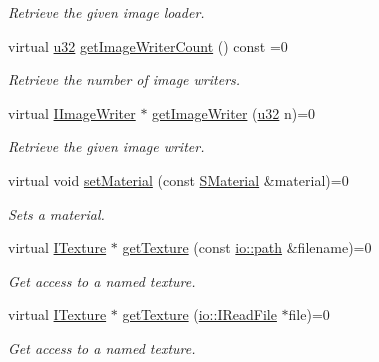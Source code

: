 \begin{DoxyCompactItemize}
\begin{DoxyCompactList}\small\item\em Retrieve the given image loader. \end{DoxyCompactList}\item 
virtual \hyperlink{namespaceirr_a0416a53257075833e7002efd0a18e804}{u32} \hyperlink{classirr_1_1video_1_1IVideoDriver_a173f33f0537a1511abdf35ed235a683a}{get\+Image\+Writer\+Count} () const =0
\begin{DoxyCompactList}\small\item\em Retrieve the number of image writers. \end{DoxyCompactList}\item 
virtual \hyperlink{classirr_1_1video_1_1IImageWriter}{I\+Image\+Writer} $\ast$ \hyperlink{classirr_1_1video_1_1IVideoDriver_acdc5e788993c117efebb22e155ab6a77}{get\+Image\+Writer} (\hyperlink{namespaceirr_a0416a53257075833e7002efd0a18e804}{u32} n)=0
\begin{DoxyCompactList}\small\item\em Retrieve the given image writer. \end{DoxyCompactList}\item 
virtual void \hyperlink{classirr_1_1video_1_1IVideoDriver_a8c9e31b41b7e6fd26cf65ce538ebab05}{set\+Material} (const \hyperlink{classirr_1_1video_1_1SMaterial}{S\+Material} \&material)=0
\begin{DoxyCompactList}\small\item\em Sets a material. \end{DoxyCompactList}\item 
virtual \hyperlink{classirr_1_1video_1_1ITexture}{I\+Texture} $\ast$ \hyperlink{classirr_1_1video_1_1IVideoDriver_af4055165190e4adf221c6dc6f2434ea0}{get\+Texture} (const \hyperlink{namespaceirr_1_1io_a6468281622ce3a1c46b72e19f32dded5}{io\+::path} \&filename)=0
\begin{DoxyCompactList}\small\item\em Get access to a named texture. \end{DoxyCompactList}\item 
virtual \hyperlink{classirr_1_1video_1_1ITexture}{I\+Texture} $\ast$ \hyperlink{classirr_1_1video_1_1IVideoDriver_aaf989c8688ffe2a28a4b8e7b6ec2bce7}{get\+Texture} (\hyperlink{classirr_1_1io_1_1IReadFile}{io\+::\+I\+Read\+File} $\ast$file)=0
\begin{DoxyCompactList}\small\item\em Get access to a named texture. \end{DoxyCompactList}\item 

\end{DoxyCompactItemize}
